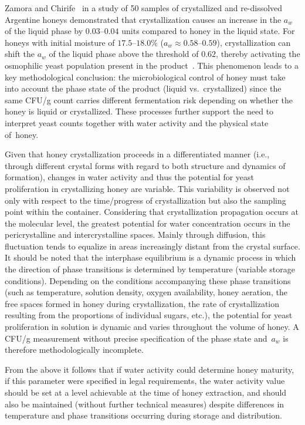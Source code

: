 \documentclass[foods,review,accept,pdftex,moreauthors]{Definitions/mdpi}
\begin{document}
{Zamora and Chirife~\cite{zamora2006} in a study of 50 samples
of crystallized and re-dissolved Argentine honeys demonstrated
that crystallization causes an increase in the $a_w$ of the liquid
phase by $0.03$--$0.04$ units compared to honey in the liquid
state. For honeys with initial moisture of $17.5$--$18.0\%$
($a_w \approx 0.58$--$0.59$), crystallization can shift the
$a_w$ of the liquid phase above the threshold of $0.62$, thereby
activating the osmophilic yeast population present in the
product~\cite{zamora2006,ijfans2019}.
This phenomenon leads to a key methodological conclusion: the
microbiological control of honey must take into account the phase
state of the product (liquid vs.\ crystallized) since the same
CFU/g count carries different fermentation risk depending on whether
the honey is liquid or crystallized. These processes further support the need to interpret yeast counts together with water activity and the physical state \mbox{of honey.}

Given that honey crystallization proceeds in a differentiated
manner (i.e., through different crystal forms with regard to both
structure and dynamics of formation), changes in water activity
and thus the potential for yeast proliferation in crystallizing
honey are variable. This variability is observed not only with
respect to the time/progress of crystallization but also the
sampling point within the container. Considering that crystallization
propagation occurs at the molecular level, the greatest potential
for water concentration occurs in the pericrystalline and
intercrystalline spaces. Mainly through diffusion, this fluctuation
tends to equalize in areas increasingly distant from the crystal
surface. It should be noted that the interphase equilibrium is a
dynamic process in which the direction of phase transitions is
determined by temperature (variable storage conditions). Depending
on the conditions accompanying these phase transitions (such as
temperature, solution density, oxygen availability, honey aeration,
the free spaces formed in honey during crystallization, the rate of
crystallization resulting from the proportions of individual sugars,
etc.), the potential for yeast proliferation in solution is dynamic
and varies throughout the volume of honey. A CFU/g measurement
without precise specification of the phase state and~$a_w$ is
therefore methodologically incomplete.

From the above it follows that if water activity could determine
honey maturity, if this parameter were specified in legal
requirements, the water activity value should be set at a level
achievable at the time of honey extraction, and should also be
maintained (without further technical measures) despite differences
in temperature and phase transitions occurring during storage and
distribution.


}
\end{document}
